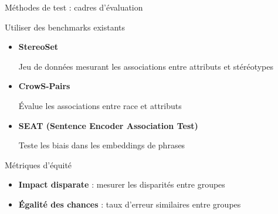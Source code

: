 \begin{frame}{Méthodes de test : cadres d'évaluation}

    \begin{block}{Utiliser des benchmarks existants}
        \medskip
        \begin{itemize}
            \item<+-> \textbf{StereoSet}

            Jeu de données mesurant les associations entre attributs et stéréotypes

            \item<+-> \textbf{CrowS-Pairs}

            Évalue les associations entre race et attributs

            \item<+-> \textbf{SEAT (Sentence Encoder Association Test)}

            Teste les biais dans les embeddings de phrases
        \end{itemize}
    \end{block}

    \bigskip

    \begin{overprint}
        \begin{block}{Métriques d'équité}
            \begin{itemize}
                \item \textbf{Impact disparate} : mesurer les disparités entre groupes
                \item \textbf{Égalité des chances} : taux d'erreur similaires entre groupes
            \end{itemize}
        \end{block}
    \end{overprint}

\end{frame}



